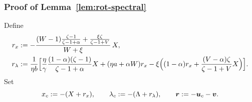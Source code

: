 \subsubsection{Proof of Lemma~\ref{lem:rot-spectral}}
\label{app:lb-rotation-spectral-proof}
Define
\[
\begin{aligned}
r_x&:=-\frac{(W-1)\frac{\zeta-1}{\zeta-1+\alpha}+\frac{\xi\zeta}{\zeta-1+V}}
  {W+\xi}\,X,\\
r_\lambda&:=\frac{1}{\eta b}\Bigl[\frac{\eta}{\gamma}
  \frac{(1-\alpha)(\zeta-1)}{\zeta-1+\alpha}X+(\eta a+\alpha W)r_x
  -\xi\Bigl((1-\alpha)r_x+\frac{(V-\alpha)\zeta}{\zeta-1+V}X\Bigr)\Bigr].
\end{aligned}
\]
Set
\begin{equation}
x_c:=-(X+r_x),\qquad \lambda_c:=-(\Lambda+r_\lambda),\qquad
\bm{r}:=-\bm{u}_c-\bm{v} .
\label{eq:rot-shift}
\end{equation}
